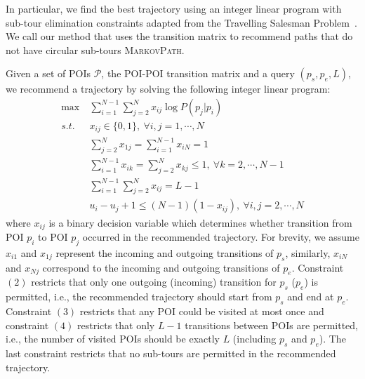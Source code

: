In particular, we find the best trajectory using an integer linear program with
sub-tour elimination constraints adapted from the Travelling Salesman Problem~\cite{opt98}.
We call our method that uses the transition matrix to recommend paths
that do not have circular sub-tours \textsc{MarkovPath}.

Given a set of POIs $\mathcal{P}$, the POI-POI transition matrix and a query $(p_s, p_e, L)$,
we recommend a trajectory by solving the following integer linear program:
\begin{align}
\max ~& \sum_{i=1}^{N-1} \sum_{j=2}^N x_{ij} \log P(p_j | p_i) \nonumber \\
s.t. ~& x_{ij} \in \{0, 1\}, ~\forall i, j = 1, \cdots, N \\
     & \sum_{j=2}^N x_{1j} = \sum_{i=1}^{N-1} x_{iN} = 1 \\
     & \sum_{i=1}^{N-1} x_{ik} = \sum_{j=2}^N x_{kj} \le 1, ~\forall k=2, \cdots, N-1 \\
     & \sum_{i=1}^{N-1} \sum_{j=2}^N x_{ij} = L-1 \\
     & u_i - u_j + 1 \le (N-1) (1-x_{ij}), ~\forall i, j = 2, \cdots, N
\end{align}
where $x_{ij}$ is a binary decision variable which determines whether transition from POI $p_i$ to POI $p_j$
occurred in the recommended trajectory.
For brevity, we assume $x_{i1}$ and $x_{1j}$ represent the incoming and outgoing transitions of $p_s$,
similarly, $x_{iN}$ and $x_{Nj}$ correspond to the incoming and outgoing transitions of $p_e$.
Constraint $(2)$ restricts that only one outgoing (incoming) transition for $p_s$ ($p_e$)
is permitted, i.e., the recommended trajectory should start from $p_s$ and end at $p_e$.
Constraint $(3)$ restricts that any POI could be visited at most once and constraint $(4)$
restricts that only $L-1$ transitions between POIs are permitted, i.e., the number of visited POIs should be
exactly $L$ (including $p_s$ and $p_e$).
The last constraint restricts that no sub-tours are permitted in the recommended trajectory.
